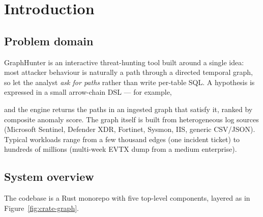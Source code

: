\chapter{Introduction}
\label{ch:intro}

\section{Problem domain}

GraphHunter is an interactive threat-hunting tool built around a
single idea: most attacker behaviour is naturally a path through a
directed temporal graph, so let the analyst \emph{ask for paths}
rather than write per-table SQL. A hypothesis is expressed in a
small arrow-chain DSL --- for example,

\begin{center}
\end{center}

and the engine returns the paths in an ingested graph that satisfy
it, ranked by composite anomaly score. The graph itself is built
from heterogeneous log sources (Microsoft Sentinel, Defender XDR,
Fortinet, Sysmon, IIS, generic CSV/JSON). Typical workloads range
from a few thousand edges (one incident ticket) to hundreds of
millions (multi-week EVTX dump from a medium enterprise).

\section{System overview}

The codebase is a Rust monorepo with five top-level components,
layered as in Figure~\ref{fig:crate-graph}.


